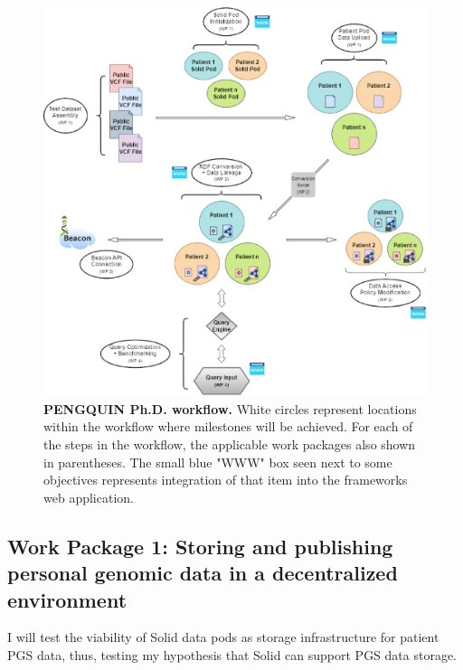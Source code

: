 \documentclass[runningheads]{llncs}
\begin{document}
\begin{figure}
\includegraphics[width=\textwidth]{fig1.eps}
\caption{\textbf{PENGQUIN Ph.D. workflow.}
White circles represent locations within the workflow where milestones will be achieved. 
For each of the steps in the workflow, the applicable work packages also shown in parentheses. 
The small blue "WWW" box seen next to some objectives represents integration of that item into the framework\textquotesingle s web application.
} \label{fig1}
\end{figure}

\subsection{Work Package 1: Storing and publishing personal genomic data in a decentralized environment} 

I will test the viability of Solid data pods as storage infrastructure for patient PGS data, thus, testing my hypothesis that Solid can support PGS data storage. 
\end{document}
